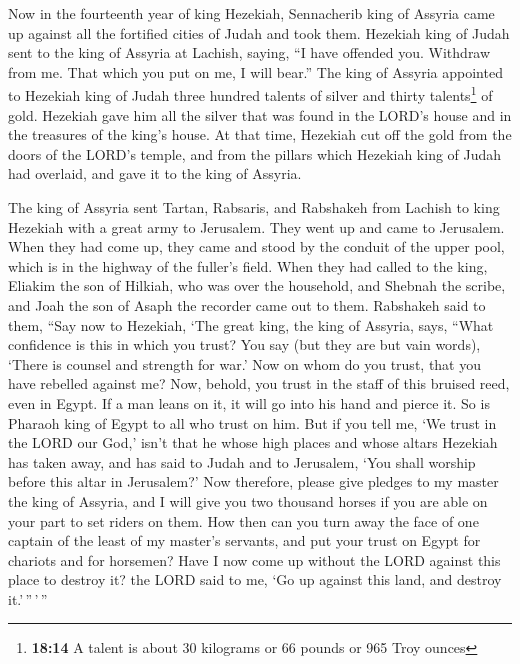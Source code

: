  Now in the fourteenth year of king Hezekiah, Sennacherib
king of Assyria came up against all the fortified cities of Judah and
took them.  Hezekiah king of Judah sent to the king of
Assyria at Lachish, saying, ``I have offended you. Withdraw from me.
That which you put on me, I will bear.'' The king of Assyria appointed
to Hezekiah king of Judah three hundred talents of silver and thirty
talents\footnote{\textbf{18:14} A talent is about 30 kilograms or 66
  pounds or 965 Troy ounces} of gold.  Hezekiah gave him
all the silver that was found in the LORD's house and in the treasures
of the king's house.  At that time, Hezekiah cut off the
gold from the doors of the LORD's temple, and from the pillars which
Hezekiah king of Judah had overlaid, and gave it to the king of Assyria.

 The king of Assyria sent Tartan, Rabsaris, and Rabshakeh
from Lachish to king Hezekiah with a great army to Jerusalem. They went
up and came to Jerusalem. When they had come up, they came and stood by
the conduit of the upper pool, which is in the highway of the fuller's
field.  When they had called to the king, Eliakim the son
of Hilkiah, who was over the household, and Shebnah the scribe, and Joah
the son of Asaph the recorder came out to them. 
Rabshakeh said to them, ``Say now to Hezekiah, `The great king, the king
of Assyria, says, ``What confidence is this in which you trust?
 You say (but they are but vain words), `There is counsel
and strength for war.' Now on whom do you trust, that you have rebelled
against me?  Now, behold, you trust in the staff of this
bruised reed, even in Egypt. If a man leans on it, it will go into his
hand and pierce it. So is Pharaoh king of Egypt to all who trust on him.
 But if you tell me, `We trust in the LORD our God,'
isn't that he whose high places and whose altars Hezekiah has taken
away, and has said to Judah and to Jerusalem, `You shall worship before
this altar in Jerusalem?'  Now therefore, please give
pledges to my master the king of Assyria, and I will give you two
thousand horses if you are able on your part to set riders on them.
 How then can you turn away the face of one captain of
the least of my master's servants, and put your trust on Egypt for
chariots and for horsemen?  Have I now come up without
the LORD against this place to destroy it? the LORD said to me, `Go up
against this land, and destroy it.'\,''\,'\,''

